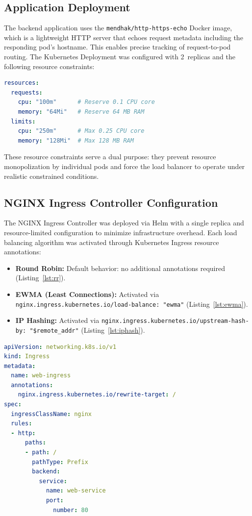 \documentclass[conference]{IEEEtran}
\begin{document}
\subsection{Application Deployment}

The backend application uses the \texttt{mendhak/http-https-echo} Docker image, which is a lightweight HTTP server that echoes request metadata including the responding pod's hostname. This enables precise tracking of request-to-pod routing. The Kubernetes Deployment was configured with 2~replicas and the following resource constraints:

\begin{lstlisting}[language=yaml, caption={Deployment resource configuration}, label={lst:deployment}]
resources:
  requests:
    cpu: "100m"      # Reserve 0.1 CPU core
    memory: "64Mi"   # Reserve 64 MB RAM
  limits:
    cpu: "250m"      # Max 0.25 CPU core
    memory: "128Mi"  # Max 128 MB RAM
\end{lstlisting}

These resource constraints serve a dual purpose: they prevent resource monopolization by individual pods and force the load balancer to operate under realistic constrained conditions.

\subsection{NGINX Ingress Controller Configuration}

The NGINX Ingress Controller was deployed via Helm with a single replica and resource-limited configuration to minimize infrastructure overhead. Each load balancing algorithm was activated through Kubernetes Ingress resource annotations:

\begin{itemize}
    \item \textbf{Round Robin:} Default behavior: no additional annotations required (Listing~\ref{lst:rr}).
    \item \textbf{EWMA (Least Connections):} Activated via \texttt{nginx.ingress.kubernetes.io/load-balance: "ewma"} (Listing~\ref{lst:ewma}).
    \item \textbf{IP Hashing:} Activated via \texttt{nginx.ingress.kubernetes.io/upstream-hash-by: "\$remote\_addr"} (Listing~\ref{lst:iphash}).
\end{itemize}

\begin{lstlisting}[language=yaml, caption={Round Robin Ingress (default)}, label={lst:rr}]
apiVersion: networking.k8s.io/v1
kind: Ingress
metadata:
  name: web-ingress
  annotations:
    nginx.ingress.kubernetes.io/rewrite-target: /
spec:
  ingressClassName: nginx
  rules:
  - http:
      paths:
      - path: /
        pathType: Prefix
        backend:
          service:
            name: web-service
            port:
              number: 80
\end{lstlisting}
\end{document}
